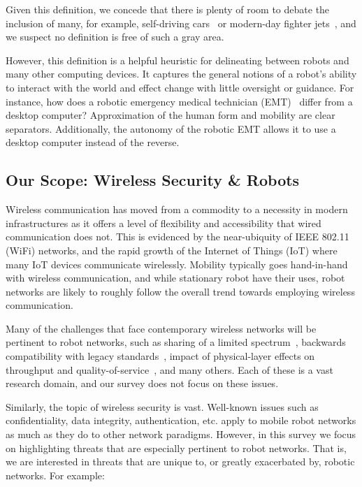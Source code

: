 Given this definition, we concede that there is plenty of room to debate the inclusion of many, for example, self-driving cars~\cite{} or modern-day fighter jets~\cite{}, and we suspect no definition is free of such a gray area. 

However, this definition is a helpful heuristic for delineating between robots and many other computing devices. It captures the general notions of a robot's ability to interact with the world and effect change with little oversight or guidance. For instance, how does a robotic emergency medical technician (EMT)~\cite{} differ from a desktop computer? Approximation of the human form and mobility are clear separators. Additionally, the autonomy of the robotic EMT allows it to use a desktop computer instead of the reverse.



\subsection{Our Scope: Wireless Security \& Robots}
 
Wireless communication has moved from a commodity to a necessity in modern infrastructures as it offers a level of flexibility and accessibility that wired communication does not. This is evidenced by the near-ubiquity of IEEE 802.11 (WiFi) networks, and the rapid growth of the Internet of Things (IoT)  where many IoT devices communicate wirelessly. Mobility typically goes hand-in-hand with wireless communication, and while stationary robot have their uses, robot networks are likely to roughly follow the overall trend towards employing wireless communication.

Many of the challenges that face contemporary wireless networks will be pertinent to robot networks, such as sharing of a limited spectrum~\cite{}, backwards compatibility with legacy standards~\cite{}, impact of physical-layer effects on throughput and quality-of-service~\cite{}, and many others. Each of these is a vast research domain, and our survey does not focus on these issues.

Similarly, the topic of wireless security is vast. Well-known issues such as confidentiality, data integrity, authentication, etc. apply to mobile robot networks as much as they do to other network paradigms. However, in this survey we focus on highlighting threats that are especially pertinent to robot networks. That is, we are interested in threats that are unique to, or greatly exacerbated by, robotic networks. 
For example:

